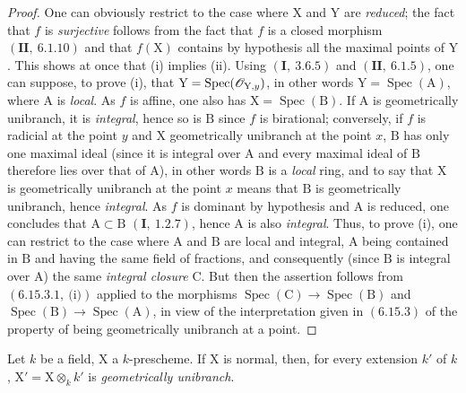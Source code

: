 \begin{proof}
One can obviously restrict to the case where $\mathrm{X}$ and $\mathrm{Y}$ are \emph{reduced}; the fact that $f$ is
\emph{surjective} follows from the fact that $f$ is a closed morphism $(\mathbf{II},~6.1.10)$ and that $f(\mathrm{X})$ contains
by hypothesis all the maximal points of $\mathrm{Y}$. This shows at once that (i) implies (ii).
Using $(\mathbf{I},~3.6.5)$ and $(\mathbf{II},~6.1.5)$, one can suppose, to prove (i), that $\mathrm{Y}=\operatorname{Spec}(\mathscr{O}_{\mathrm{Y},y})$,
in other words $\mathrm{Y}=\operatorname{Spec}(\mathrm{A})$, where $\mathrm{A}$ is \emph{local}. As $f$ is affine, one also has
$\mathrm{X}=\operatorname{Spec}(\mathrm{B})$. If $\mathrm{A}$ is geometrically unibranch, it is \emph{integral}, hence so is $\mathrm{B}$
since $f$ is birational; conversely, if $f$ is radicial at the point $y$ and $\mathrm{X}$ geometrically unibranch at the
point $x$, $\mathrm{B}$ has only one maximal ideal (since it is integral over $\mathrm{A}$ and every maximal ideal of $\mathrm{B}$
therefore lies over that of $\mathrm{A}$), in other words $\mathrm{B}$ is a \emph{local} ring, and to say that $\mathrm{X}$ is
geometrically unibranch at the point $x$ means that $\mathrm{B}$ is geometrically unibranch, hence \emph{integral}.
As $f$ is dominant by hypothesis and $\mathrm{A}$ is reduced, one concludes that $\mathrm{A}\subset\mathrm{B}$ $(\mathbf{I},~1.2.7)$,
hence $\mathrm{A}$ is also \emph{integral}. Thus, to prove (i), one can restrict to the case where $\mathrm{A}$ and $\mathrm{B}$
are local and integral, $\mathrm{A}$ being contained in $\mathrm{B}$ and having the same field of fractions, and consequently
(since $\mathrm{B}$ is integral over $\mathrm{A}$) the same \emph{integral closure} $\mathrm{C}$. But then the assertion follows
from $(6.15.3.1,~\text{(i)})$ applied to the morphisms $\operatorname{Spec}(\mathrm{C})\to\operatorname{Spec}(\mathrm{B})$ and
$\operatorname{Spec}(\mathrm{B})\to\operatorname{Spec}(\mathrm{A})$, in view of the interpretation given in $(6.15.3)$ of the
property of being geometrically unibranch at a point.
\end{proof}

\begin{proposition}[6.15.6]
\label{IV.6.15.6}
Let $k$ be a field, $\mathrm{X}$ a $k$-prescheme. If $\mathrm{X}$ is normal, then,
for every extension $k'$ of $k$, $\mathrm{X}'=\mathrm{X}\otimes_k k'$ is \emph{geometrically unibranch}.
\end{proposition}

